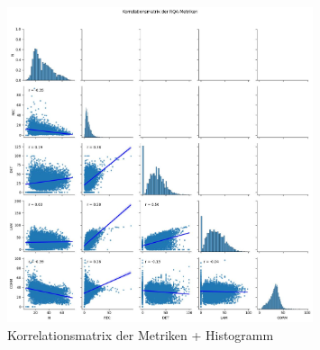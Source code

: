 \documentclass[
    language=german, %
    thesis=seminar, %
    supervisor=postdoc, %
    multiauthor=true, %
    ]{settings/csssa-thesis}
\begin{document}
\begin{figure}[ht]
    \centering
    \includegraphics[width=0.8\textwidth,height=0.8\textheight,keepaspectratio]{figures/Bild13.jpeg}
    \caption{Korrelationsmatrix der Metriken + Histogramm}\label{fig:Bild12}
\end{figure}
\end{document}
